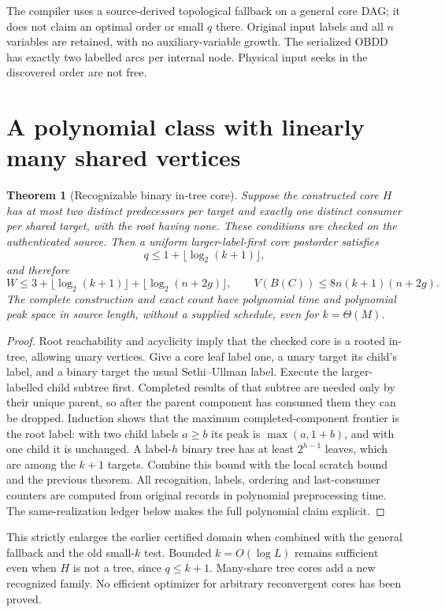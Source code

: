 \documentclass[11pt]{article}
\newtheorem{theorem}{Theorem}
\begin{document}
The compiler uses a source-derived topological fallback on a general core DAG; it does not claim an optimal order or small $q$ there. Original input labels and all $n$ variables are retained, with no auxiliary-variable growth. The serialized OBDD has exactly two labelled arcs per internal node. Physical input seeks in the discovered order are not free.

\section{A polynomial class with linearly many shared vertices}
\begin{theorem}[Recognizable binary in-tree core]
Suppose the constructed core $H$ has at most two distinct predecessors per target and exactly one distinct consumer per shared target, with the root having none. These conditions are checked on the authenticated source. Then a uniform larger-label-first core postorder satisfies
\[
 q\le1+\lfloor\log_2(k+1)\rfloor,
\]
and therefore
\[
 W\le3+\lfloor\log_2(k+1)\rfloor+
             \lfloor\log_2(n+2g)\rfloor,
 \qquad V(B(C))\le8n(k+1)(n+2g).
\]
The complete construction and exact count have polynomial time and polynomial peak space in source length, without a supplied schedule, even for $k=\Theta(M)$.
\end{theorem}
\begin{proof}
Root reachability and acyclicity imply that the checked core is a rooted in-tree, allowing unary vertices. Give a core leaf label one, a unary target its child's label, and a binary target the usual Sethi--Ullman label. Execute the larger-labelled child subtree first. Completed results of that subtree are needed only by their unique parent, so after the parent component has consumed them they can be dropped. Induction shows that the maximum completed-component frontier is the root label: with two child labels $a\ge b$ its peak is $\max(a,1+b)$, and with one child it is unchanged. A label-$h$ binary tree has at least $2^{h-1}$ leaves, which are among the $k+1$ targets. Combine this bound with the local scratch bound and the previous theorem. All recognition, labels, ordering and last-consumer counters are computed from original records in polynomial preprocessing time. The same-realization ledger below makes the full polynomial claim explicit.
\end{proof}

This strictly enlarges the earlier certified domain when combined with the general fallback and the old small-$k$ test. Bounded $k=O(\log L)$ remains sufficient even when $H$ is not a tree, since $q\le k+1$. Many-share tree cores add a new recognized family. No efficient optimizer for arbitrary reconvergent cores has been proved.
\end{document}

